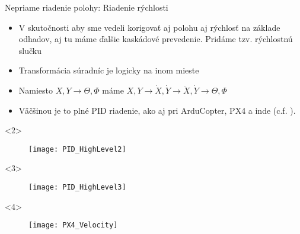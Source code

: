   \begin{frame}[t]{Nepriame riadenie polohy: Riadenie rýchlosti}
\begin{itemize}
\item<1-> V skutočnosti aby sme vedeli korigovať aj polohu aj rýchlosť na základe odhadov, aj tu máme ďalšie kaskádové prevedenie. Pridáme tzv. rýchlostnú slučku
\item<2-> Transformácia súradníc je logicky na inom mieste
\item<3-> Namiesto $X,Y\rightarrow\Theta,\Phi$ máme $X,Y\rightarrow \dot{X},\dot{Y}\rightarrow \ddot{X},\dot{Y}\rightarrow\Theta,\Phi$
\item<4->  Väčšinou je to plné PID riadenie, ako aj pri ArduCopter, PX4 a inde (c.f. \cite{Saha2020}).
\end{itemize}

  \begin{onlyenv}<2>
  \begin{figure}
\centering
  \texttt{[image: PID\_HighLevel2]}\\
\end{figure}
\end{onlyenv}


  \begin{onlyenv}<3>
  \begin{figure}
\centering
  \texttt{[image: PID\_HighLevel3]}\\
\end{figure}
\end{onlyenv}


  \begin{onlyenv}<4>
  \begin{figure}
\centering
  \texttt{[image: PX4\_Velocity]}\\
\end{figure}
\end{onlyenv}
  \end{frame}



